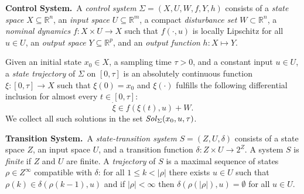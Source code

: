  
\smallskip
\noindent\textbf{Control System.}\
A \emph{control system} $\Sigma = (X, U, W, f, Y, h)$
consists of a \emph{state space} $X\subseteq \mathbb{R}^n$,
 an \emph{input space} $U\subseteq\mathbb{R}^m$, 
a compact \emph{disturbance set} $W\subset \mathbb{R}^n$, 
a \emph{nominal dynamics} $f:X\times U\rightarrow X$ such that $f(\cdot,u)$ is locally Lipschitz for all $u\in U$,
an \emph{output space} $Y\subseteq \mathbb{R}^p$, and
an \emph{output function} $h\colon X\mapsto Y$. 
%

Given an initial state $x_0\in X$, a sampling time $\tau>0$, and a constant input $u\in U$, 
a \emph{state trajectory} of $\Sigma$ 
on $[0,\tau]$ is an absolutely continuous function $\xi:[0,\tau]\rightarrow X$  such that $\xi(0) = x_0$ and
$\xi(\cdot)$ fulfills the following differential inclusion for almost every $t\in[0,\tau]$:
\begin{equation}\label{equ:def_f}
 \dot{\xi}\in f(\xi(t),u) + W. 
\end{equation} 
We collect all such solutions in the set $\mathit{Sol}_\Sigma(x_0,u,\tau)$. 

\smallskip
\noindent\textbf{Transition System.}\
A \emph{state-transition system} $S=(Z,U,\delta)$ consists of a state space $Z$, an input space $U$, and a transition function $\delta:Z\times U \rightarrow 2^Z$. 
A system $S$ is \emph{finite} if $Z$ and $U$ are finite. 
A \emph{trajectory} of $S$ is a maximal sequence of states $\rho\in Z^\infty$ compatible with $\delta$:
for all $1\leq k < |\rho|$ there exists $u\in U$ such that $\rho(k)\in \delta(\rho(k-1),u)$ and 
if $|\rho| < \infty$ then $\delta(\rho(|\rho|),u)= \emptyset$ for all $u\in U$.

